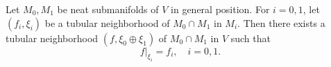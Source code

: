 Let $M_0, M_1$ be neat submanifolds of $V$ in general position. For $i = 0, 1$, let $(f_i, \xi_i)$ be a tubular neighborhood of $M_0 \cap M_1$ in $M_i$. Then there exists a tubular neighborhood $(f, \xi_0 \oplus \xi_1)$ of $M_0 \cap M_1$ in $V$ such that
$$f|_{\xi_i} = f_i, \quad i = 0, 1.$$
